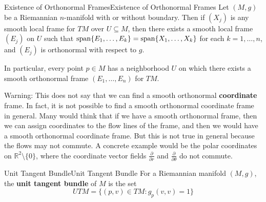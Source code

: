 \documentclass[../main.tex]{subfiles}
\begin{document}
\begin{proposition}{Existence of Orthonormal Frames}{Existence of Orthonormal Frames}
	Let $(M, g)$ be a Riemannian $n$-manifold with or without boundary. Then if $(X_j)$ is any smooth local frame for $TM$ over $U \subseteq M$, then there exists a smooth local frame $(E_j)$ on $U$ such that $\operatorname{span}\{E_1, \ldots, E_k\} = \operatorname{span}\{X_1, \ldots, X_k\}$ for each $k = 1, \ldots, n$, and $(E_j)$ is orthonormal with respect to $g$.

	In particular, every point $p \in M$ has a neighborhood $U$ on which there exists a smooth orthonormal frame $(E_1, \ldots, E_n)$ for $TM$.
\end{proposition}

\begin{remark}
	Warning: This does not say that we can find a smooth orthonormal \textbf{coordinate} frame. In fact, it is not possible to find a smooth orthonormal coordinate frame in general. Many would think that if we have a smooth orthonormal frame, then we can assign coordinates to the flow lines of the frame, and then we would have a smooth orthonormal coordinate frame. But this is not true in general because the flows may not commute. A concrete example would be the polar coordinates on $\mathbb{R}^2 \setminus \{0\}$, where the coordinate vector fields $\frac{\partial}{\partial r}$ and $\frac{\partial}{\partial \theta}$ do not commute.
\end{remark}

\begin{definition}{Unit Tangent Bundle}{Unit Tangent Bundle}
	For a Riemannian manifold $(M, g)$, the \textbf{unit tangent bundle} of $M$ is the set
	\begin{equation}
		UTM = \{(p, v) \in TM : g_p(v, v) = 1\}
	\end{equation}
\end{definition}
\end{document}
